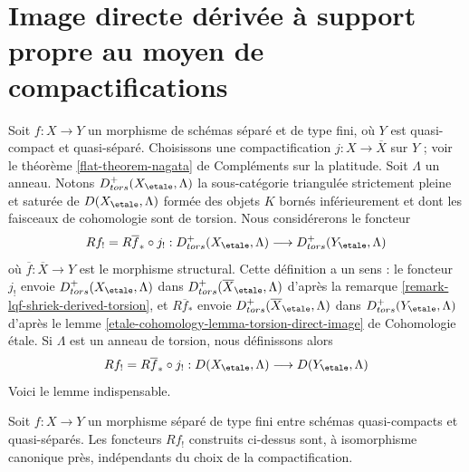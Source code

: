 \section{Image directe dérivée à support propre au moyen de compactifications}
\label{section-derived-lower-shriek-compactification}

\noindent
Soit $f : X \to Y$ un morphisme de schémas séparé et de type fini,
où $Y$ est quasi-compact et quasi-séparé. Choisissons une compactification
$j : X \to \overline{X}$ sur $Y$ ; voir le
théorème \ref{flat-theorem-nagata} de Compléments sur la platitude.
Soit $\Lambda$ un anneau. Notons $D^+_{tors}(X_\etale, \Lambda)$
la sous-catégorie triangulée strictement pleine et saturée de
$D(X_\etale, \Lambda)$ formée des objets $K$ bornés inférieurement
et dont les faisceaux de cohomologie sont de torsion. Nous considérerons le
foncteur
$$
Rf_! = R\overline{f}_* \circ j_! :
D^+_{tors}(X_\etale, \Lambda)
\longrightarrow
D^+_{tors}(Y_\etale, \Lambda)
$$
où $\overline{f} : \overline{X} \to Y$ est le morphisme structural.
Cette définition a un sens : le foncteur $j_!$ envoie $D^+_{tors}(X_\etale, \Lambda)$ dans
$D^+_{tors}(\overline{X}_\etale, \Lambda)$ d'après la
remarque \ref{remark-lqf-shriek-derived-torsion}, et $R\overline{f}_*$ envoie
$D^+_{tors}(\overline{X}_\etale, \Lambda)$ dans $D^+_{tors}(Y_\etale, \Lambda)$
d'après le lemme \ref{etale-cohomology-lemma-torsion-direct-image} de Cohomologie étale.
Si $\Lambda$ est un anneau de torsion, nous définissons alors
$$
Rf_! = R\overline{f}_* \circ j_! :
D(X_\etale, \Lambda)
\longrightarrow
D(Y_\etale, \Lambda)
$$
Voici le lemme indispensable.

\begin{lemma}
\label{lemma-shriek-well-defined}
Soit $f : X \to Y$ un morphisme séparé de type fini entre schémas quasi-compacts
et quasi-séparés. Les foncteurs $Rf_!$ construits ci-dessus sont,
à isomorphisme canonique près, indépendants du choix de la
compactification.
\end{lemma}

